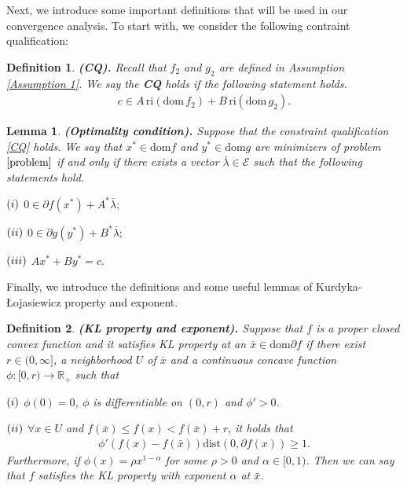 \documentclass{article}
\numberwithin{equation}{section}
\newtheorem{lemma}{Lemma}[section]
\newtheorem{definition}{Definition}[section]
\begin{document}
Next, we introduce some important definitions that will be used in our convergence analysis. To start with, 
we consider the following contraint qualification: 
\begin{definition}
    {\rm{\textbf{(CQ).}}} Recall that $f_2$ and $g_2$ are defined in Assumption \ref{Assumption 1}. 
    We say the \textbf{CQ} holds if the following statement holds. 
    \begin{align}
        c \in A\hspace{2pt} \mathrm{ri}\left(\mathrm{dom}\hspace{2pt}f_2\right) +
    B\hspace{2pt} \mathrm{ri}\left(\mathrm{dom}\hspace{2pt}g_2\right).  \label{CQ} 
    \end{align}
\end{definition}
\begin{lemma}
    {\rm{\textbf{(Optimality condition).}}} \label{optimal}
    Suppose that the constraint qualification \eqref{CQ} holds. 
    We say that $x^*\in \mathrm{dom}f$ and $y^*\in \mathrm{dom}g$ are minimizers of problem $\eqref{problem}$ 
    if and only if there exists a vector $\bar{\lambda} \in \mathcal{E}$ such that the following statements hold.
    
    $(\romannumeral1)$ $0 \in \partial f(x^*) + A^*\bar{\lambda};  $

    $(\romannumeral2)$ $0 \in \partial g(y^*) + B^*\bar{\lambda};  $

    $(\romannumeral3)$ $Ax^* + By^* =c. $
    
\end{lemma}

Finally, we introduce the definitions and some useful lemmas of Kurdyka-\L{}ojasiewicz property and exponent.
\begin{definition}
    {\rm{\textbf{(KL property and exponent).}}} Suppose that $f$ is a proper closed convex function and it satisfies KL property 
    at an $\bar{x}\in \mathrm{dom} \partial f$ if there exist $r\in (0,\infty]$, a neighborhood $U$ of $\bar{x}$
    and a continuous concave function $\phi: [0,r) \rightarrow \mathbb{R}_+$ such that

    $(\romannumeral1)$ $\phi(0) = 0$, $\phi$ is differentiable on $(0,r)$ and $\phi' >0$.

    $(\romannumeral2)$ $\forall x\in U$ and $f(\bar{x}) \leq f(x) < f(\bar{x}) +r$, it holds that
                            \begin{align}
                                \phi'(f(x)-f(\bar{x}))\mathrm{dist}(0,\partial f(x)) \geq 1. \nonumber
                            \end{align}
    Furthermore, if $\phi(x) = \rho x^{1-\alpha}$ for some $\rho>0$ and $\alpha\in[0,1)$. Then we can 
    say that $f$ satisfies the KL property with exponent $\alpha$ at $\bar{x}$. 
\end{definition}
\end{document}
